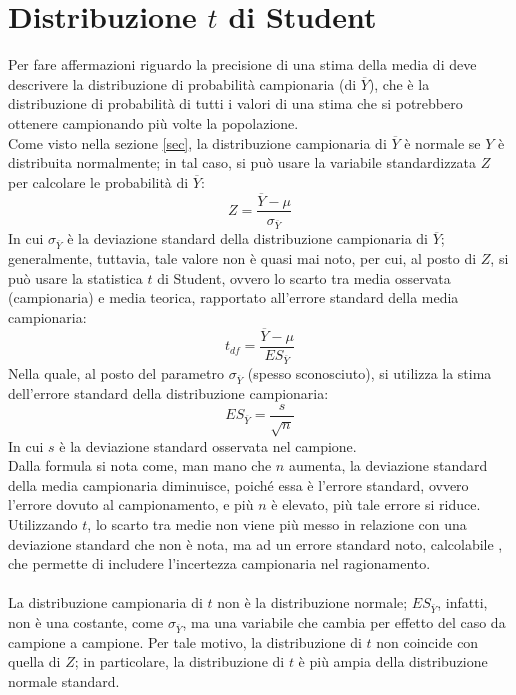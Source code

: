 \documentclass[10pt, draft]{book}
\begin{document}
\section{Distribuzione \texorpdfstring{$t$}{Lg} di Student}
Per fare affermazioni riguardo la precisione di una stima della media di deve descrivere la distribuzione di probabilità campionaria (di $\overline{Y}$), che è la distribuzione di probabilità di tutti i valori di una stima che si potrebbero ottenere campionando più volte la popolazione.
\\
Come visto nella sezione \ref{sec}, la distribuzione campionaria di $\overline{Y}$ è normale se $Y$ è distribuita normalmente; in tal caso, si può usare la variabile standardizzata $Z$ per calcolare le probabilità di $\overline{Y}$:
\begin{equation}
    Z = \frac{\overline{Y}-\mu}{\sigma_{\overline{Y}}}
\end{equation}
In cui $\sigma_{\overline{Y}}$ è la deviazione standard della distribuzione campionaria di $\overline{Y}$; generalmente, tuttavia, tale valore non è quasi mai noto, per cui, al posto di $Z$, si può usare la statistica $t$ di Student, ovvero lo scarto tra media osservata (campionaria) e media teorica, rapportato all'errore standard della media campionaria:
\begin{equation}
    t_{df} = \frac{\overline{Y}-\mu}{ES_{\overline{Y}}}
\end{equation}
Nella quale, al posto del parametro $\sigma_{\overline{Y}}$ (spesso sconosciuto), si utilizza la stima dell'errore standard della distribuzione campionaria:
\begin{equation}
    ES_{\overline{Y}} = \frac{s}{\sqrt{n}}
\end{equation}
In cui $s$ è la deviazione standard osservata nel campione.
\\
Dalla formula si nota come, man mano che $n$ aumenta, la deviazione standard della media campionaria diminuisce, poiché essa è l'errore standard, ovvero l'errore dovuto al campionamento, e più $n$ è elevato, più tale errore si riduce.
\\
Utilizzando $t$, lo scarto tra medie non viene più messo in relazione con una deviazione standard che non è nota, ma ad un errore standard noto, calcolabile , che permette di includere l'incertezza campionaria nel ragionamento.
\\
\\
La distribuzione campionaria di $t$ non è la distribuzione normale; $ES_{\overline{Y}}$, infatti, non è una costante, come $\sigma_{\overline{Y}}$, ma una variabile che cambia per effetto del caso da campione a campione. Per tale motivo, la distribuzione di $t$ non coincide con quella di $Z$; in particolare, la distribuzione di $t$ è più ampia della distribuzione normale standard.
\end{document}
